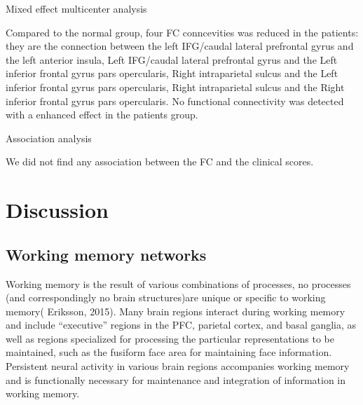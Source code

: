 \documentclass[preprint,authoryear,review,12pt,times]{elsarticle}
\begin{document}
Mixed effect multicenter analysis

Compared to the normal group, four FC conncevities was reduced in the patients: they are the connection between the left IFG/caudal lateral prefrontal gyrus and the left anterior insula, Left IFG/caudal lateral prefrontal gyrus and the Left inferior frontal gyrus pars opercularis, Right intraparietal sulcus and the Left inferior frontal gyrus pars opercularis, Right intraparietal sulcus and the Right inferior frontal gyrus pars opercularis. No functional connectivity was detected with a enhanced effect in the patients group.  


Association analysis

We did not find any association between the FC and the clinical scores.
\section*{Discussion} 

\subsection*{Working memory networks}


Working memory is the result of various combinations of processes, no processes (and correspondingly no brain structures)are unique or specific to working memory( Eriksson, 2015). Many brain regions interact during working memory and include ``executive'' regions in the PFC, parietal cortex, and basal ganglia, as well as regions specialized for processing the particular representations to be maintained, such as the fusiform face area for maintaining face information. Persistent neural activity in various brain regions accompanies working memory and is functionally necessary for maintenance and integration of information in working memory.
\end{document}
